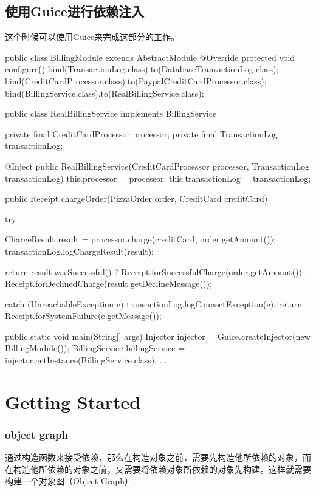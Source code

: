 \subsection{使用Guice进行依赖注入}

这个时候可以使用Guice来完成这部分的工作。

\begin{Java}[通过configure来指定如果生成对象]
public class BillingModule extends AbstractModule {
  @Override 
  protected void configure() {
    bind(TransactionLog.class).to(DatabaseTransactionLog.class);
    bind(CreditCardProcessor.class).to(PaypalCreditCardProcessor.class);
    bind(BillingService.class).to(RealBillingService.class);
  }
}
\end{Java}


\begin{Java}
public class RealBillingService implements BillingService {
  private final CreditCardProcessor processor;
  private final TransactionLog transactionLog;

  @Inject
  public RealBillingService(CreditCardProcessor processor,
      TransactionLog transactionLog) {
    this.processor = processor;
    this.transactionLog = transactionLog;
  }

  public Receipt chargeOrder(PizzaOrder order, CreditCard creditCard) {
    try {
      ChargeResult result = processor.charge(creditCard, order.getAmount());
      transactionLog.logChargeResult(result);

      return result.wasSuccessful()
          ? Receipt.forSuccessfulCharge(order.getAmount())
          : Receipt.forDeclinedCharge(result.getDeclineMessage());
     } catch (UnreachableException e) {
      transactionLog.logConnectException(e);
      return Receipt.forSystemFailure(e.getMessage());
    }
  }
}
\end{Java}

\begin{Java}[这样在顶层只需要这样]
  public static void main(String[] args) {
    Injector injector = Guice.createInjector(new BillingModule());
    BillingService billingService = injector.getInstance(BillingService.class);
    ...
  }
\end{Java}


\section{Getting Started}

\subsubsection{object graph}
通过构造函数来接受依赖，那么在构造对象之前，需要先构造他所依赖的对象，而在构造他所依赖的对象之前，又需要将依赖对象所依赖的对象先构建。这样就需要构建一个对象图（Object Graph）.

